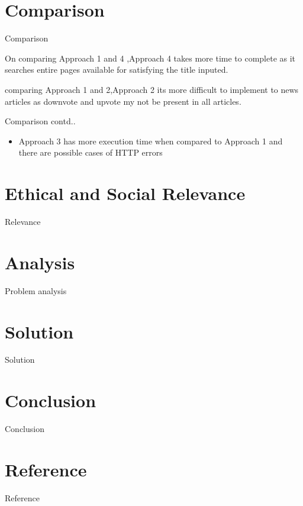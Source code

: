 \documentclass{beamer}
\begin{document}
	\section{Comparison}
	\begin{frame}{Comparison}
	\begin{itemize}
            \item \Large{On comparing Approach 1 and 4 ,Approach 4 takes more time to complete as it searches entire pages available for satisfying the title inputed.      
            \item comparing Approach 1 and 2,Approach 2 its more difficult to implement to news articles as downvote and upvote my not be present in all articles.}
  	    \end{itemize}
  	 \end{frame}
    \begin{frame}{Comparison contd..}
        \begin{itemize}
            \item \Large {Approach 3 has more execution time when compared to Approach 1 and there are possible cases of HTTP errors}
        \end{itemize}
	\end{frame}
	\section{Ethical and Social Relevance}
	\begin{frame}{Relevance}
	\end{frame}
	\section{Analysis}
	\begin{frame}{Problem analysis}
	\end{frame}
	\section{Solution}
	\begin{frame}{Solution}
	\end{frame}
	\section{Conclusion}
	\begin{frame}{Conclusion}
	\end{frame}
	\section{Reference}
	\begin{frame}{Reference}
	\end{frame}
\end{document}
